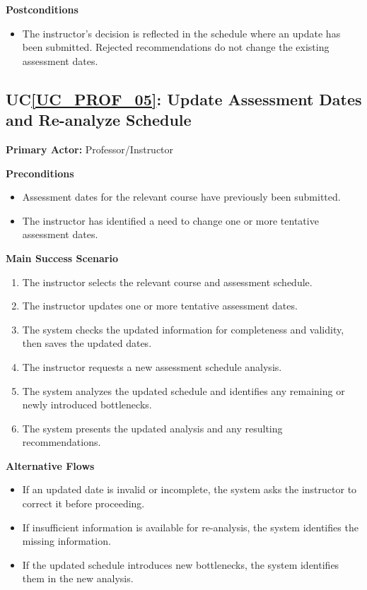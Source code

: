 \documentclass[12pt]{article}
\newcounter{ucnum} %
\newcommand{\ucref}[1]{UC\ref{#1}}
\begin{document}
\noindent \textbf{Postconditions}
\begin{itemize}
  \item The instructor's decision is reflected in the schedule where an update has been submitted. Rejected recommendations do not change the existing assessment dates.
\end{itemize}



 \label{UC_PROF_05}
\subsection{\ucref{UC_PROF_05}: Update Assessment Dates and Re-analyze Schedule}

\noindent \textbf{Primary Actor:} Professor/Instructor

\noindent \textbf{Preconditions}
\begin{itemize}
  \item Assessment dates for the relevant course have previously been submitted.
  \item The instructor has identified a need to change one or more tentative assessment dates.
\end{itemize}

\noindent \textbf{Main Success Scenario}
\begin{enumerate}
  \item The instructor selects the relevant course and assessment schedule.
  \item The instructor updates one or more tentative assessment dates.
  \item The system checks the updated information for completeness and validity, then saves the updated dates.
  \item The instructor requests a new assessment schedule analysis.
  \item The system analyzes the updated schedule and identifies any remaining or newly introduced bottlenecks.
  \item The system presents the updated analysis and any resulting recommendations.
\end{enumerate}

\noindent \textbf{Alternative Flows}
\begin{itemize}
  \item If an updated date is invalid or incomplete, the system asks the instructor to correct it before proceeding.
  \item If insufficient information is available for re-analysis, the system identifies the missing information.
  \item If the updated schedule introduces new bottlenecks, the system identifies them in the new analysis.
\end{itemize}
\end{document}
